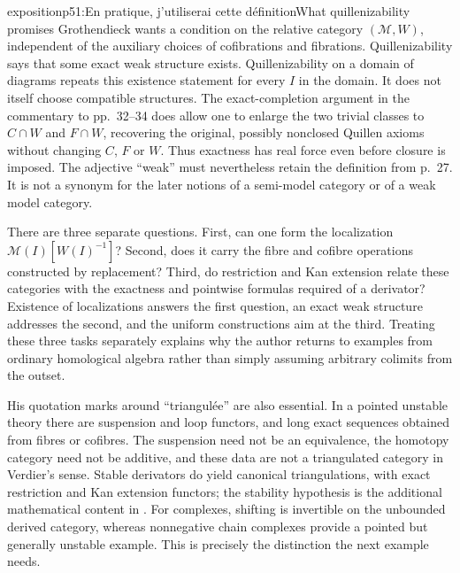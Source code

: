 \begin{dcomment}{exposition}{p51:En pratique, j'utiliserai cette définition}{What quillenizability promises}
Grothendieck wants a condition on the relative category $(\mathcal M,W)$, independent of the auxiliary choices of cofibrations and fibrations. Quillenizability says that some exact weak structure exists. Quillenizability on a domain of diagrams repeats this existence statement for every $I$ in the domain. It does not itself choose compatible structures. The exact-completion argument in the commentary to pp.~32--34 does allow one to enlarge the two trivial classes to $C\cap W$ and $F\cap W$, recovering the original, possibly nonclosed Quillen axioms without changing $C$, $F$ or $W$. Thus exactness has real force even before closure is imposed. The adjective ``weak'' must nevertheless retain the definition from p.~27. It is not a synonym for the later notions of a semi-model category or of a weak model category.

There are three separate questions. First, can one form the localization $\mathcal M(I)[W(I)^{-1}]$? Second, does it carry the fibre and cofibre operations constructed by replacement? Third, do restriction and Kan extension relate these categories with the exactness and pointwise formulas required of a derivator? Existence of localizations answers the first question, an exact weak structure addresses the second, and the uniform constructions aim at the third. Treating these three tasks separately explains why the author returns to examples from ordinary homological algebra rather than simply assuming arbitrary colimits from the outset.

His quotation marks around ``triangulée'' are also essential. In a pointed unstable theory there are suspension and loop functors, and long exact sequences obtained from fibres or cofibres. The suspension need not be an equivalence, the homotopy category need not be additive, and these data are not a triangulated category in Verdier's sense. Stable derivators do yield canonical triangulations, with exact restriction and Kan extension functors; the stability hypothesis is the additional mathematical content in \citet[Theorem~4.16]{Groth2013}. For complexes, shifting is invertible on the unbounded derived category, whereas nonnegative chain complexes provide a pointed but generally unstable example. This is precisely the distinction the next example needs.
\end{dcomment}


